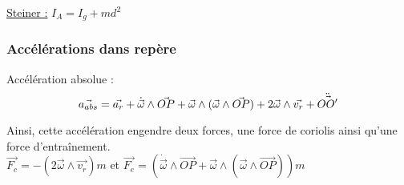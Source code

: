 \documentclass[../main.tex]{subfiles}
\begin{document}
\quad \underline{Steiner :} $I_A = I_g+md^2$\\

\subsubsection{Accélérations dans repère}
Accélération absolue : \\
\begin{equation}
    \vec{a_{abs}} = \vec{a_r} + \dot{\vec{\omega}} \wedge \vec{OP} + \vec{\omega} \wedge (\vec{\omega}\wedge \vec{OP}) + 2\vec{\omega} \wedge \vec{v_r} + \Ddot{\vec{OO'}}
\end{equation}

Ainsi, cette accélération engendre deux forces, une force de coriolis ainsi qu'une force d'entraînement.\\
$\vec{F_c} = -(2\vec{\omega} \wedge \vec{v_r})m$ et $\vec{F_e} = (\dot{\vec{\omega}} \wedge \vec{OP} + \vec{\omega} \wedge (\vec{\omega}\wedge \vec{OP}))m$\\
\end{document}
